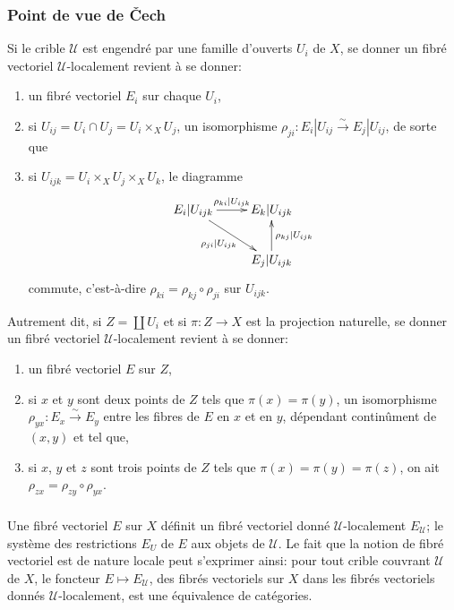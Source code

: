 \documentclass{article}
\newcommand{\cU}{\mathcal{U}}
\newcommand{\iso}{\xrightarrow\sim}
\begin{document}
\subsubsection{Point de vue de Čech}\label{1-3-2}

Si le crible $\cU$ est engendré par une famille d'ouverts $U_i$ de $X$, se 
donner un fibré vectoriel $\cU$-localement revient à se donner:
\begin{enumerate}[\indent a)]
  \item un fibré vectoriel $E_i$ sur chaque $U_i$, 
  \item si $U_{ij} = U_i\cap U_j = U_i\times_X U_j$, un isomorphisme 
    $\rho_{ji} : E_i|U_{ij} \iso E_j|U_{ij}$, de sorte que 
  \item si $U_{ijk} = U_i\times_X U_j\times_X U_k$, le diagramme 
    \[\xymatrix{
      E_i |U_{ijk} \ar[r]^-{\rho_{ki}|U_{ijk}} \ar[dr]_-{\rho_{ji}|U_{ijk}} 
        & E_k|U_{ijk} \\
      & E_j|U_{ijk} \ar[u]_-{\rho_{kj}|U_{ijk}}
    }\]
    commute, c'est-à-dire $\rho_{ki} = \rho_{kj}\circ \rho_{ji}$ sur 
    $U_{ijk}$. 
\end{enumerate}

Autrement dit, si $Z=\coprod U_i$ et si $\pi:Z\to X$ est la projection 
naturelle, se donner un fibré vectoriel $\cU$-localement revient à se donner: 
\begin{enumerate}[\indent a)]
  \item un fibré vectoriel $E$ sur $Z$, 
  \item si $x$ et $y$ sont deux points de $Z$ tels que $\pi(x) = \pi(y)$, un 
    isomorphisme $\rho_{y x}:E_x\iso E_y$ entre les fibres de $E$ en $x$ et en 
    $y$, dépendant continûment de $(x,y)$ et tel que, 
  \item si $x$, $y$ et $z$ sont trois points de $Z$ tels que 
  $\pi(x)=\pi(y)=\pi(z)$, on ait $\rho_{zx} = \rho_{zy}\circ \rho_{yx}$. 
\end{enumerate}





\subsubsection{}\label{1-3-3}

Une fibré vectoriel $E$ sur $X$ définit un fibré vectoriel donné 
$\cU$-localement $E_\cU$; le système des restrictions $E_U$ de $E$ aux objets 
de $\cU$. Le fait que la notion de fibré vectoriel est de nature locale peut 
s'exprimer ainsi: pour tout crible couvrant $\cU$ de $X$, le foncteur 
$E\mapsto E_\cU$, des fibrés vectoriels sur $X$ dans les fibrés vectoriels 
donnés $\cU$-localement, est une équivalence de catégories. 
\end{document}
